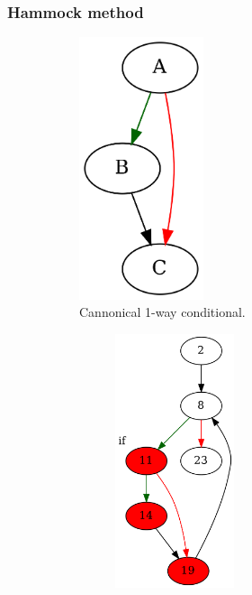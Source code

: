 \documentclass[aspectratio=1610]{beamer}
\begin{document}
\begin{frame}
	\frametitle{Hammock method}


	\begin{figure}[htbp]
		\centering
		\begin{subfigure}[b]{0.20\textwidth}
			\centering
			
			\includegraphics[width=0.4\textwidth]{inc/methods/hammock/example/if.png}
			\caption{Cannonical 1-way conditional.}
		\end{subfigure}
		\quad
		\begin{subfigure}[b]{0.65\textwidth}
			\centering
			\begin{subfigure}[ht]{0.40\textwidth}
				\centering
				\includegraphics[width=0.5\textwidth]{inc/methods/hammock/example/main_0002a.png}

\end{subfigure}
\end{subfigure}
\end{figure}
\end{frame}
\end{document}
